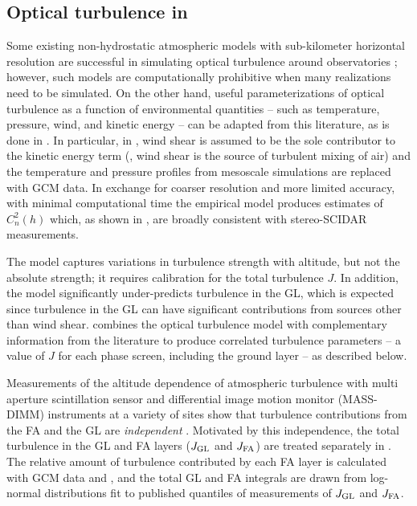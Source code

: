 \documentclass[twocolumn]{aastex631}
\begin{document}
\subsection{Optical turbulence in \psfws}\label{sec:psfwsturb}
Some existing non-hydrostatic atmospheric models with sub-kilometer horizontal resolution are successful in simulating optical turbulence around observatories \citep{masciadri_3D_2001, masciadri_optical_2017}; however, such models are computationally prohibitive when many realizations need to be simulated. 
On the other hand, useful parameterizations of optical turbulence as a function of environmental quantities -- such as temperature, pressure, wind, and kinetic energy -- can be adapted from this literature, as is done in \osborn \citep{osborn_optical_2018}.
In particular, in \osborn,  wind shear is assumed to be the sole contributor to the kinetic energy term (\ie, wind shear is the source of turbulent mixing of air) and the temperature and pressure profiles from mesoscale simulations are replaced with GCM data.
In exchange for coarser resolution and more limited accuracy, with minimal computational time the \osborn empirical model produces estimates of $C_n^2(h)$ which, as shown in \osborn, are broadly consistent with stereo-SCIDAR measurements. 

The \osborn model captures variations in turbulence strength with altitude, but not the absolute strength; it requires calibration for the total turbulence $J$.
In addition, the \osborn model significantly under-predicts turbulence in the GL, which is expected since turbulence in the GL can have significant contributions from sources other than wind shear.
\psfws combines the \osborn optical turbulence model with complementary information from the literature to produce correlated turbulence parameters -- a value of $J$ for each phase screen, including the ground layer -- as described below.

Measurements of the altitude dependence of atmospheric turbulence with 
multi aperture scintillation sensor and differential image motion monitor (MASS-DIMM) instruments
at a variety of sites show that turbulence contributions from the FA and the GL are \textit{independent} \citep{tokovinin_model_2005, tokovinin_optical_2005, chun_mauna_2009}.
Motivated by this independence, the total turbulence in the GL and FA layers ($J_{\rm GL}$ and $J_{\rm FA}$) are treated separately in \psfws.
The relative amount of turbulence contributed by each FA layer is calculated with GCM data and \osborn, and the total GL and FA integrals are drawn from log-normal distributions fit to published quantiles of measurements of $J_{\rm GL}$ and $J_{\rm FA}$.
\end{document}
